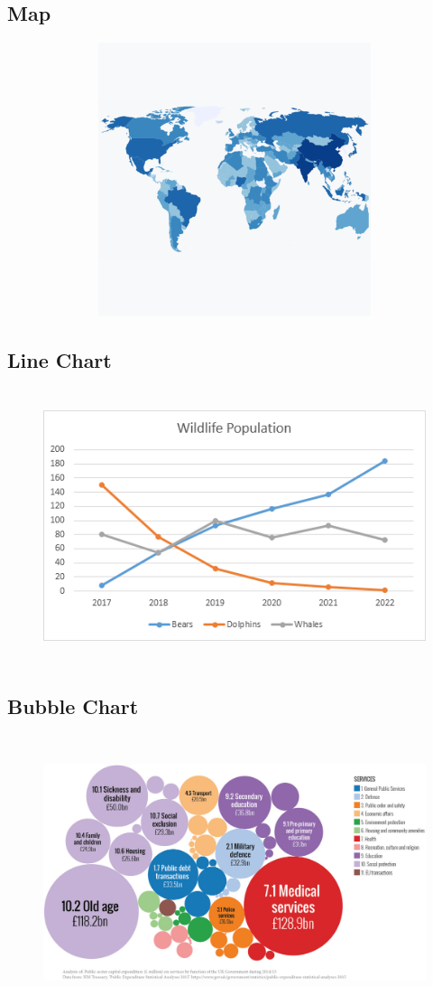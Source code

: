 \documentclass[12pt]{article}
\begin{document}
\subsection*{Map}
\begin{figure}[h]
    \centering
    \includegraphics[width=12cm, height=8cm]{choropleth_basic.png}
    \centering
\end{figure}

\subsection*{Line Chart}
\begin{figure}[h]
    \centering
    \includegraphics[width=12cm, height=8cm]{line-chart.png}
    \centering
\end{figure}

\newpage

\subsection*{Bubble Chart}
\begin{figure}[h]
    \centering
    \includegraphics[width=13cm, height=8cm]{bubble-chart.png}
    \centering
\end{figure}
\end{document}

